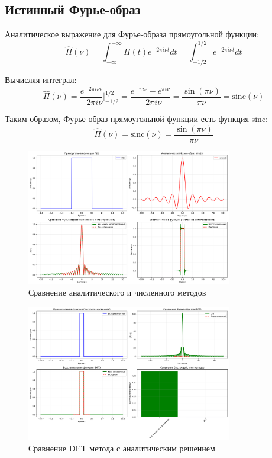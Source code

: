 \subsection*{Истинный Фурье-образ}

Аналитическое выражение для Фурье-образа прямоугольной функции:
\begin{equation}
\hat{\Pi}(\nu) = \int_{-\infty}^{+\infty} \Pi(t) e^{-2\pi i \nu t} dt = \int_{-1/2}^{1/2} e^{-2\pi i \nu t} dt
\end{equation}

Вычисляя интеграл:
\begin{equation}
\hat{\Pi}(\nu) = \frac{e^{-2\pi i \nu t}}{-2\pi i \nu} \Bigg|_{-1/2}^{1/2} = \frac{e^{-\pi i \nu} - e^{\pi i \nu}}{-2\pi i \nu} = \frac{\sin(\pi \nu)}{\pi \nu} = \text{sinc}(\nu)
\end{equation}

Таким образом, Фурье-образ прямоугольной функции есть функция sinc:
\begin{equation}
\hat{\Pi}(\nu) = \text{sinc}(\nu) = \frac{\sin(\pi \nu)}{\pi \nu}
\end{equation}

\begin{figure}[H]
    \centering
    \includegraphics[width=0.8\textwidth]{images/task1/analytical_and_trapz_comparison.png}
    \caption{Сравнение аналитического и численного методов}
    \label{fig:analytical_trapz}
\end{figure}

\begin{figure}[H]
    \centering
    \includegraphics[width=0.8\textwidth]{images/task1/dft_comparison.png}
    \caption{Сравнение DFT метода с аналитическим решением}
    \label{fig:dft_comparison}
\end{figure}

